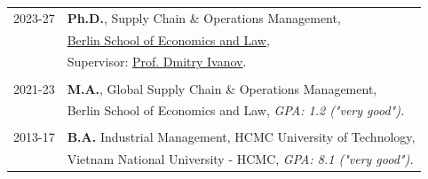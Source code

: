 

\renewcommand{\thefootnote}{\fnsymbol{footnote}}
\setcounter{footnote}{0}

\begin{longtable}[l]{@{}p{} p{}}
    2023-27\footnotemark & \textbf{Ph.D.}, Supply Chain \& Operations Management,\\
    & 
    \href{https://www.hwr-berlin.de/en/}
    {Berlin School of Economics and Law},\\
    & Supervisor: \href{https://scholar.google.de/citations?hl=de&user=yxK6B_oAAAAJ}{Prof. Dmitry Ivanov}. \\\\ 

    2021-23 & \textbf{M.A.}, Global Supply Chain \& Operations Management, \\
    & Berlin School of Economics and Law, \textit{GPA: 1.2 ("very good").}\\\\

    2013-17 & \textbf{B.A.} Industrial Management, HCMC University of Technology, \\
    & Vietnam National University - HCMC, \textit{GPA: 8.1 ("very good").}
\end{longtable}



\renewcommand{\thefootnote}{\arabic{footnote}}
\setcounter{footnote}{1}
